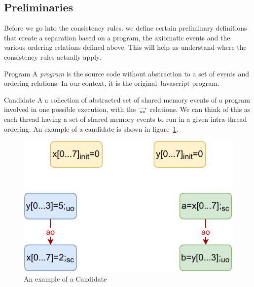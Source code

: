 \subsection{Preliminaries}
    
    Before we go into the consistency rules. we define certain preliminary definitions that create a separation based on a program, the axiomatic events and the various ordering relations defined above. This will help us understand where the consistency rules actually apply.    
    
    \begin{definition}{Program} 
        A \emph{program} is the source code without abstraction to a set of events and ordering relations. In our context, it is the original Javascript program. 
        
    \end{definition}
    
    \begin{definition}{Candidate}
        A a collection of abstracted set of shared memory events of a program involved in one possible execution, with the $\stackrel{\longrightarrow}{_\textit{ao}}$ relations. We can think of this as each thread having a set of shared memory events to run in a given intra-thread ordering. An example of a candidate is shown in figure~\ref{fig:candidate}.
        
        \begin{figure}[H]
            \centering
            \includegraphics[scale=0.7]{ECMAScriptMemoryModel/candidate.pdf}
            \caption{An example of a Candidate}
            \label{fig:candidate}
        \end{figure}
        
    \end{definition}
    
